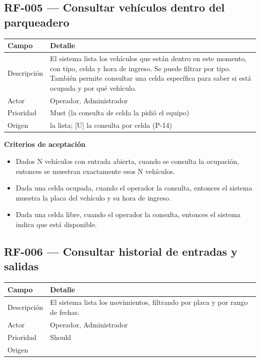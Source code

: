 \subsection{RF-005 — Consultar vehículos dentro del parqueadero}
\begin{longtable}{>{\raggedright\arraybackslash}p{3.2cm}>{\raggedright\arraybackslash}p{11.2cm}}
\toprule
\textbf{Campo} & \textbf{Detalle}\\
\midrule\endhead
Descripción & El sistema lista los vehículos que están dentro en este momento, con tipo, celda y hora de ingreso. Se puede filtrar por tipo. También permite consultar una celda específica para saber si está ocupada y por qué vehículo.\\
Actor & Operador, Administrador\\
Prioridad & Must (la consulta de celda la pidió el equipo)\\
Origen & [I] la lista; [U] la consulta por celda (P-14)\\
\bottomrule
\end{longtable}

\textbf{Criterios de aceptación}
\begin{itemize}
  \item Dados N vehículos con entrada abierta, cuando se consulta la ocupación, entonces se muestran exactamente esos N vehículos.
  \item Dada una celda ocupada, cuando el operador la consulta, entonces el sistema muestra la placa del vehículo y su hora de ingreso.
  \item Dada una celda libre, cuando el operador la consulta, entonces el sistema indica que está disponible.
\end{itemize}

\subsection{RF-006 — Consultar historial de entradas y salidas}
\begin{longtable}{>{\raggedright\arraybackslash}p{3.2cm}>{\raggedright\arraybackslash}p{11.2cm}}
\toprule
\textbf{Campo} & \textbf{Detalle}\\
\midrule\endhead
Descripción & El sistema lista los movimientos, filtrando por placa y por rango de fechas.\\
Actor & Operador, Administrador\\
Prioridad & Should\\
Origen & [I]\\
\bottomrule
\end{longtable}

